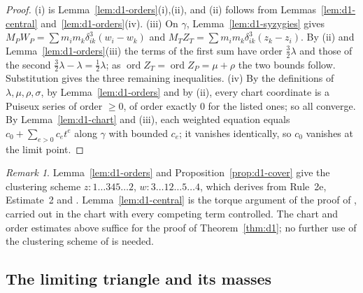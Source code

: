 \documentclass[11pt]{amsart}
\theoremstyle{definition}
\theoremstyle{remark}
\newtheorem{remark}[theorem]{Remark}
\newcommand{\ord}{\operatorname{ord}}
\begin{document}
\begin{proof}
(i) is Lemma~\ref{lem:d1-orders}(i),(ii), and (ii) follows from Lemmas~\ref{lem:d1-central}
and~\ref{lem:d1-orders}(iv).  (iii) On $\gamma$, Lemma~\ref{lem:d1-syzygies} gives
$M_PW_P=\sum m_im_k\delta_{ik}^3(w_i-w_k)$ and $M_TZ_T=\sum m_im_k\delta_{ik}^3(z_k-z_i)$.  By (ii)
and Lemma~\ref{lem:d1-orders}(iii) the terms of the first sum have order $\frac32\lambda$ and
those of the second $\frac32\lambda-\lambda=\frac12\lambda$; as $\ord Z_T=\ord Z_P=\mu+\rho$ the
two bounds follow.  {Substitution gives the three remaining inequalities.}
(iv) By the definitions of $\lambda,\mu,\rho,\sigma$, by Lemma~\ref{lem:d1-orders} and by (ii),
every chart coordinate is a Puiseux series of order $\ge0$, of order exactly $0$ for the listed
ones; so all converge.  By Lemma~\ref{lem:d1-chart} and (iii), each weighted equation equals
$c_0+\sum_{e>0}c_et^e$ along $\gamma$ with bounded $c_e$; it vanishes identically, so $c_0$
vanishes at the limit point.
\end{proof}

\begin{remark}\label{rem:d1-ak}
{Lemma~\ref{lem:d1-orders}} and Proposition~\ref{prop:d1-cover} give the clustering scheme
$z:1\ldots345\ldots2$, $w:3\ldots12\ldots5\ldots4$, which
\cite[\S8.1, p.~572]{AK} derives from Rule~2e, Estimate~2 and \cite[Prop.~4]{AK}.
Lemma~\ref{lem:d1-central} is the torque argument of the proof of \cite[Prop.~4]{AK}, carried out
in the chart with every competing term controlled.  {The chart and order estimates above suffice for the proof of
Theorem~\ref{thm:d1}; no further use of the clustering scheme of \cite[\S8.1]{AK} is needed.}
\end{remark}

\subsection{The limiting triangle and its masses}
\end{document}
